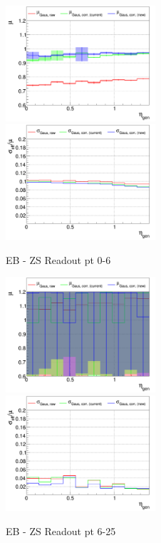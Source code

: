 
\begin{figure}
\includegraphics[width=0.495\textwidth]{./ECAL_plots/plotsNOPU/EB/ZS/pdf/GENETA/EBZS_GENETA_0000_0006_MuOverBins.pdf}
\includegraphics[width=0.495\textwidth]{./ECAL_plots/plotsNOPU/EB/ZS/pdf/GENETA/EBZS_GENETA_0000_0006_EffSigmaOverBins.pdf}
\caption{EB - ZS Readout pt 0-6}
\end{figure}

\begin{figure}
\includegraphics[width=0.495\textwidth]{./ECAL_plots/plotsNOPU/EB/ZS/pdf/GENETA/EBZS_GENETA_0006_0025_MuOverBins.pdf}
\includegraphics[width=0.495\textwidth]{./ECAL_plots/plotsNOPU/EB/ZS/pdf/GENETA/EBZS_GENETA_0006_0025_EffSigmaOverBins.pdf}
\caption{EB - ZS Readout pt 6-25}
\end{figure}



